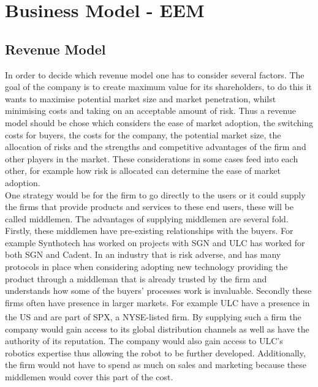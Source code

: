 \documentclass[11pt]{article}		%
\newcommand{\supercite}[1]{\textsuperscript{\cite{#1}}}		%
\begin{document}
	\section{Business Model - EEM}
		\subsection{Revenue Model}
        	 In order to decide which revenue model one has to consider several factors. The goal of the company is to create maximum value for its shareholders, to do this it wants to maximise potential market size and market penetration, whilst minimising costs and taking on an acceptable amount of risk. Thus a revenue model should be chose which considers the ease of market adoption, the switching costs for buyers, the costs for the company, the potential market size, the allocation of risks and the strengths and competitive advantages of the firm and other players in the market. These considerations in some cases feed into each other, for example how risk is allocated can determine the ease of market adoption.
        	 \\
            One strategy would be for the firm to go directly to the users or it could supply the firms that provide products and services to these end users, these will be called middlemen.
            The advantages of supplying middlemen are several fold. Firstly, these middlemen have pre-existing relationships with the buyers. For example Synthotech has worked on projects with SGN and ULC has worked for both SGN and Cadent. In an industry that is risk adverse, and has many protocols in place when considering adopting new technology providing the product through a middleman that is already trusted by the firm and understands how some of the buyers’ processes work is invaluable. Secondly these firms often have presence in larger markets. For example ULC have a presence in the US and are part of SPX, a NYSE-listed firm.\supercite{SPX_acquisition} By supplying such a firm the company would gain access to its global distribution channels as well as have the authority of its reputation. The company would also gain access to ULC’s robotics expertise thus allowing the robot to be further developed. Additionally, the firm would not have to spend as much on sales and marketing because these middlemen would cover this part of the cost.
            \\
\end{document}
